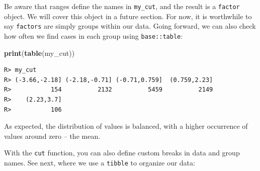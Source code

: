 \documentclass[
  12pt,
]{book}
\newenvironment{Shaded}{\begin{snugshade}}{\end{snugshade}}
\newcommand{\CommentTok}[1]{\textcolor[rgb]{0.37,0.37,0.37}{\textit{#1}}}
\newcommand{\DataTypeTok}[1]{\textcolor[rgb]{0.27,0.27,0.27}{#1}}
\newcommand{\DecValTok}[1]{\textcolor[rgb]{0.06,0.06,0.06}{#1}}
\newcommand{\KeywordTok}[1]{\textcolor[rgb]{0.27,0.27,0.27}{\textbf{#1}}}
\newcommand{\NormalTok}[1]{#1}
\newcommand{\OperatorTok}[1]{\textcolor[rgb]{0.43,0.43,0.43}{\textbf{#1}}}
\newcommand{\StringTok}[1]{\textcolor[rgb]{0.5,0.5,0.5}{#1}}
\begin{document}
Be aware that ranges define the names in \texttt{my\_cut}, and the result is a \texttt{factor} object. We will cover this object in a future section. For now, it is worthwhile to say \texttt{factors} are simply groups within our data. Going forward, we can also check how often we find cases in each group using \texttt{base::table}:

\begin{Shaded}
\begin{Highlighting}[]
\KeywordTok{print}\NormalTok{(}\KeywordTok{table}\NormalTok{(my_cut))}
\end{Highlighting}
\end{Shaded}

\begin{verbatim}
R> my_cut
R> (-3.66,-2.18] (-2.18,-0.71] (-0.71,0.759]  (0.759,2.23] 
R>           154          2132          5459          2149 
R>    (2.23,3.7] 
R>           106
\end{verbatim}

As expected, the distribution of values is balanced, with a higher occurrence of values around zero -- the mean.

With the \texttt{cut} function, you can also define custom breaks in data and group names. See next, where we use a \texttt{tibble} to organize our data:

\begin{Shaded}
\end{Shaded}
\end{document}
